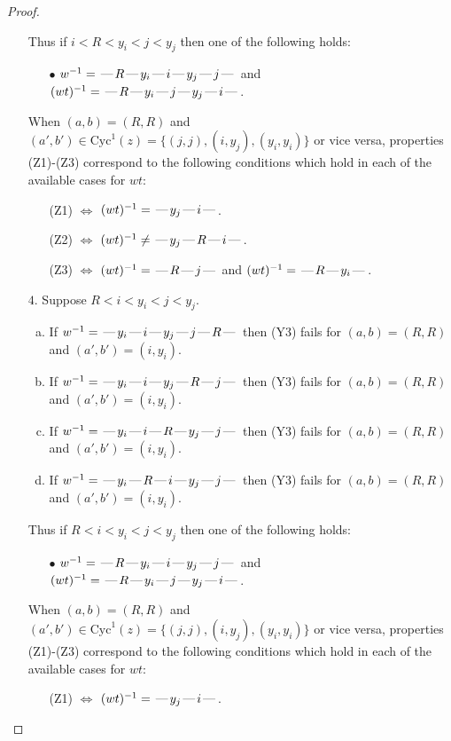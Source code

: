\documentclass[10pt]{article}
\theoremstyle{definition}
\theoremstyle{definition}
\def\dash{\text{\hspace{0.5mm}---\hspace{0.5mm}}}
\def\Cyc{\mathrm{Cyc}}
\begin{document}
\begin{proof}
\begin{enumerate}
Thus if $i < R < y_i < j < y_j$ then one of the following holds:
\begin{enumerate}
\item[$\bullet$] $w^{-1} = \dash R\dash y_i\dash i\dash y_j\dash j\dash $ and $(wt)^{-1} = \dash R\dash y_i\dash j\dash y_j\dash i\dash $.
\end{enumerate}
When $(a,b)= (R,R)$ and $(a',b')\in \Cyc^1(z)=\{(j,j),(i,y_j),(y_i,y_i)\}$ or vice versa,
properties (Z1)-(Z3) correspond to the following conditions which
hold in each of the available cases for $wt$:
\begin{enumerate}
\item[](Z1) $\Leftrightarrow$ $(wt)^{-1} = \dash y_j \dash i \dash$.
\item[](Z2) $\Leftrightarrow$ $(wt)^{-1} \neq \dash y_j \dash R \dash i \dash$.
\item[](Z3) $\Leftrightarrow$ $(wt)^{-1} = \dash R \dash j \dash$  and $(wt)^{-1} = \dash R \dash y_i \dash$.
\end{enumerate}
\item[$4$.] Suppose $R < i < y_i < j < y_j$.
\begin{enumerate}[(a)]
\item If $w^{-1} = \dash y_i\dash i\dash y_j\dash j\dash R\dash $ then (Y3) fails for $(a,b)=(R,R)$ and $(a',b')=(i,y_i)$.
\item If $w^{-1} = \dash y_i\dash i\dash y_j\dash R\dash j\dash $ then (Y3) fails for $(a,b)=(R,R)$ and $(a',b')=(i,y_i)$.
\item If $w^{-1} = \dash y_i\dash i\dash R\dash y_j\dash j\dash $ then (Y3) fails for $(a,b)=(R,R)$ and $(a',b')=(i,y_i)$.
\item If $w^{-1} = \dash y_i\dash R\dash i\dash y_j\dash j\dash $ then (Y3) fails for $(a,b)=(R,R)$ and $(a',b')=(i,y_i)$.
\end{enumerate}
Thus if $R < i < y_i < j < y_j$ then one of the following holds:
\begin{enumerate}
\item[$\bullet$] $w^{-1} = \dash R\dash y_i\dash i\dash y_j\dash j\dash $ and $(wt)^{-1} = \dash R\dash y_i\dash j\dash y_j\dash i\dash $.
\end{enumerate}
When $(a,b)= (R,R)$ and $(a',b')\in \Cyc^1(z)=\{(j,j),(i,y_j),(y_i,y_i)\}$ or vice versa,
properties (Z1)-(Z3) correspond to the following conditions which
hold in each of the available cases for $wt$:
\begin{enumerate}
\item[](Z1) $\Leftrightarrow$ $(wt)^{-1} = \dash y_j \dash i \dash$.

\end{enumerate}
\end{enumerate}
\end{proof}
\end{document}
